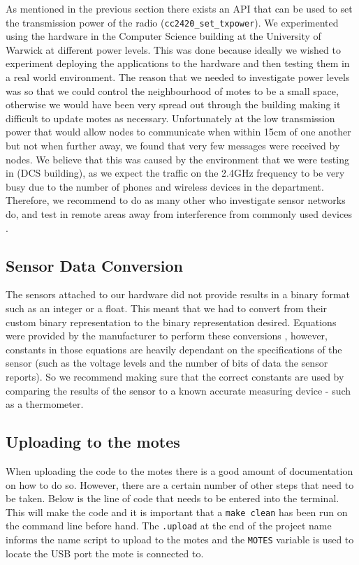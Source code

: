 As mentioned in the previous section there exists an API that can be used to set the transmission power of the radio (\verb|cc2420_set_txpower|). We experimented using the hardware in the Computer Science building at the University of Warwick at different power levels. This was done because ideally we wished to experiment deploying the applications to the hardware and then testing them in a real world environment. The reason that we needed to investigate power levels was so that we could control the neighbourhood of motes to be a small space, otherwise we would have been very spread out through the building making it difficult to update motes as necessary. Unfortunately at the low transmission power that would allow nodes to communicate when within 15cm of one another but not when further away, we found that very few messages were received by nodes. We believe that this was caused by the environment that we were testing in (DCS building), as we expect the traffic on the 2.4GHz frequency to be very busy due to the number of phones and wireless devices in the department. Therefore, we recommend to do as many other who investigate sensor networks do, and test in remote areas away from interference from commonly used devices \cite{?}.


\subsection{Sensor Data Conversion}

The sensors attached to our hardware did not provide results in a binary format such as an integer or a float. This meant that we had to convert from their custom binary representation to the binary representation desired. Equations were provided by the manufacturer to perform these conversions \cite{sensiriondatasheet}, however, constants in those equations are heavily dependant on the specifications of the sensor (such as the voltage levels and the number of bits of data the sensor reports). So we recommend making sure that the correct constants are used by comparing the results of the sensor to a known accurate measuring device - such as a thermometer.

\subsection{Uploading to the motes}

When uploading the code to the motes there is a good amount of documentation on how to do so. However, there are a certain number of other steps that need to be taken. Below is the line of code that needs to be entered into the terminal. This will make the code and it is important that a \verb|make clean| has been run on the command line before hand. The \verb|.upload| at the end of the project name informs the name script to upload to the motes and the \verb|MOTES| variable is used to locate the USB port the mote is connected to.

